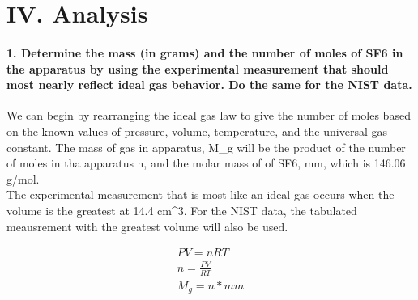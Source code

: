 \hypertarget{iv.-analysis}{%
\section{IV. Analysis}\label{iv.-analysis}}

\hypertarget{determine-the-mass-in-grams-and-the-number-of-moles-of-sf6-in-the-apparatus-by-using-the-experimental-measurement-that-should-most-nearly-reflect-ideal-gas-behavior.-do-the-same-for-the-nist-data.}{%
\paragraph{1. Determine the mass (in grams) and the number of moles of
SF6 in the apparatus by using the experimental measurement that should
most nearly reflect ideal gas behavior. Do the same for the NIST
data.}\label{determine-the-mass-in-grams-and-the-number-of-moles-of-sf6-in-the-apparatus-by-using-the-experimental-measurement-that-should-most-nearly-reflect-ideal-gas-behavior.-do-the-same-for-the-nist-data.}}

We can begin by rearranging the ideal gas law to give the number of
moles based on the known values of pressure, volume, temperature, and
the universal gas constant. The mass of gas in apparatus, M\_g will be
the product of the number of moles in tha apparatus n, and the molar
mass of of SF6, mm, which is 146.06 g/mol.\\
The experimental measurement that is most like an ideal gas occurs when
the volume is the greatest at 14.4 cm\^{}3. For the NIST data, the
tabulated meausrement with the greatest volume will also be used.

\begin{Shaded}
\end{Shaded}

\begin{align}
PV = nRT \\
n = \frac{PV}{RT} \\
M_g = n * mm

\end{align}

